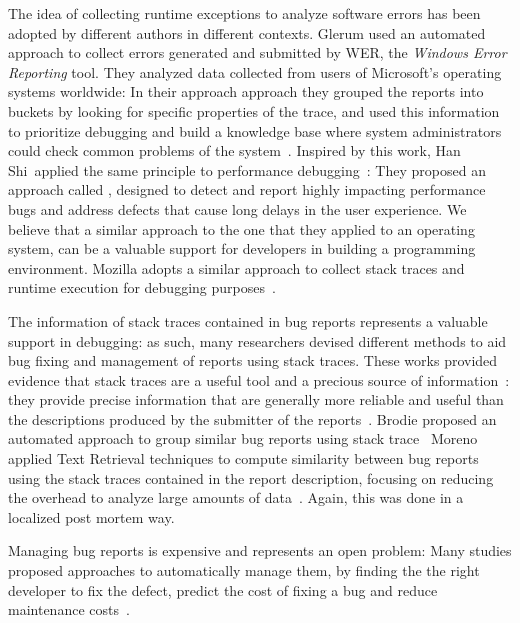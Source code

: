 The idea of collecting runtime exceptions to analyze software errors has been adopted by different authors in different contexts.
Glerum \etal used an automated approach to collect errors generated and submitted by WER, the \emph{Windows Error Reporting} tool.
They analyzed data collected from users of Microsoft's operating systems worldwide: In their approach approach they grouped the reports into buckets by looking for specific properties of the trace, and used this information to prioritize debugging and build a knowledge base where system administrators could check common problems of the system~\cite{Glerum2009}.
Inspired by this work, Han Shi~\etal applied the same principle to performance debugging~\cite{Han2012}: They proposed an approach called , designed to detect and report highly impacting performance bugs and address defects that cause long delays in the user experience.
We believe that a similar approach to the one that they applied to an operating system, can be a valuable support for developers in building a programming environment.
Mozilla adopts a similar approach to collect stack traces and runtime execution for debugging purposes~\cite{McLa2004}.

The information of stack traces contained in bug reports represents a valuable support in debugging: as such, many researchers devised different methods to aid bug fixing and management of reports using stack traces.
These works provided evidence that stack traces are a useful tool and a precious source of information~\cite{Davie2013,Wang2013,Brod2005,Weis2007a}: they provide precise information that are generally more reliable and useful than the descriptions produced by the submitter of the reports~\cite{Ko2006}.
Brodie \etal proposed an automated approach to group similar bug reports using stack trace~\cite{Brod2005}
Moreno \etal applied Text Retrieval techniques to compute similarity between bug reports using the stack traces contained in the report description, focusing on reducing the overhead to analyze large amounts of data~\cite{Moreno2014}.
Again, this was done in a localized post mortem way.

Managing bug reports is expensive and represents an open problem: Many studies proposed approaches to automatically manage them, by finding the the right developer to fix the defect, predict the cost of fixing a bug and reduce maintenance costs~\cite{Matt2009,Anvi2006a,Sliw2005,DAmb2010c}.



